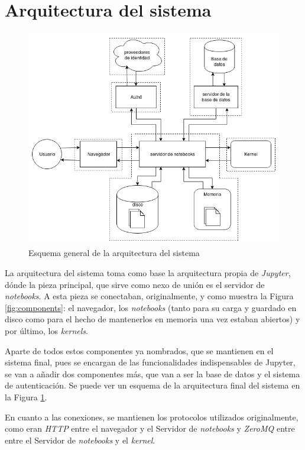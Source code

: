 \documentclass[11pt,spanish,listoffigures]{tfgetsinf}
\begin{document}

\section{Arquitectura del sistema}
\label{sec:arquitectura-sistema}

\begin{figure}[h]
	\centering
  	\includegraphics[width=1\textwidth]{Architecture.png}
  	\caption{Esquema general de la arquitectura del sistema}
  	\label{fig:general-arch}
\end{figure}

La arquitectura del sistema toma como base la arquitectura propia de \textit{Jupyter}, dónde la pieza principal, que sirve como nexo de unión es el servidor de \textit{notebooks}. A esta pieza se conectaban, originalmente, y como muestra la Figura \ref{fig:components}: el navegador, los \textit{notebooks} (tanto para su carga y guardado en disco como para el hecho de mantenerlos en memoria una vez estaban abiertos) y por último, los \textit{kernels}.

Aparte de todos estos componentes ya nombrados, que se mantienen en el sistema final, pues se encargan de las funcionalidades indispensables de Jupyter, se van a añadir dos componentes más, que van a ser la base de datos y el sistema de autenticación. Se puede ver un esquema de la arquitectura final del sistema en la Figura \ref{fig:general-arch}.

En cuanto a las conexiones, se mantienen los protocolos utilizados originalmente, como eran \textit{HTTP} entre el navegador y el Servidor de \textit{notebooks} y \textit{ZeroMQ} entre entre el Servidor de \textit{notebooks} y el \textit{kernel}. 
\end{document}
